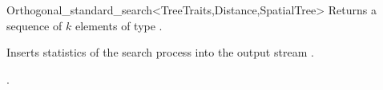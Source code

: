 \begin{ccRefClass}{Orthogonal_standard_search<TreeTraits,Distance,SpatialTree>}
{Returns a sequence of $k$ elements of type }.


\begin{ccAdvanced}
{
Inserts statistics of the search process into the output stream .
}
\end{ccAdvanced}

\ccSeeAlso

.

\end{ccRefClass}


